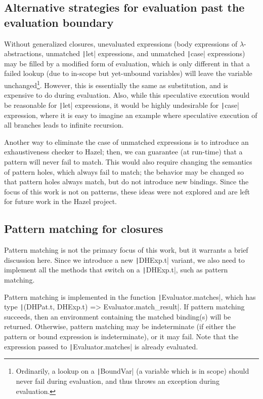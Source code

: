 \subsection{Alternative strategies for evaluation past the \\ evaluation boundary}
\label{sec:alt_strat_unevaluated}

Without generalized closures, unevaluated expressions (body expressions of $\lambda$-abstractions, unmatched \texttt|let| expressions, and unmatched \texttt|case| expressions) may be filled by a modified form of evaluation, which is only different in that a failed lookup (due to in-scope but yet-unbound variables) will leave the variable unchanged\footnote{Ordinarily, a lookup on a \texttt|BoundVar| (a variable which is in scope) should never fail during evaluation, and thus throws an exception during evaluation.}. However, this is essentially the same as substitution, and is expensive to do during evaluation. Also, while this speculative execution would be reasonable for \texttt|let| expressions, it would be highly undesirable for \texttt|case| expression, where it is easy to imagine an example where speculative execution of all branches leads to infinite recursion.

Another way to eliminate the case of unmatched expressions is to introduce an exhaustiveness checker to Hazel; then, we can guarantee (at run-time) that a pattern will never fail to match. This would also require changing the semantics of pattern holes, which always fail to match; the behavior may be changed so that pattern holes always match, but do not introduce new bindings. Since the focus of this work is not on patterns, these ideas were not explored and are left for future work in the Hazel project.

\subsection{Pattern matching for closures}
\label{sec:generalized-closures-matching}

Pattern matching is not the primary focus of this work, but it warrants a brief discussion here. Since we introduce a new \texttt|DHExp.t| variant, we also need to implement all the methods that switch on a \texttt|DHExp.t|, such as pattern matching.

Pattern matching is implemented in the function \texttt|Evaluator.matches|, which has type \texttt|(DHPat.t, DHExp.t) => Evaluator.match_result|. If pattern matching succeeds, then an environment containing the matched binding(s) will be returned. Otherwise, pattern matching may be indeterminate (if either the pattern or bound expression is indeterminate), or it may fail. Note that the expression passed to \texttt|Evaluator.matches| is already evaluated.

